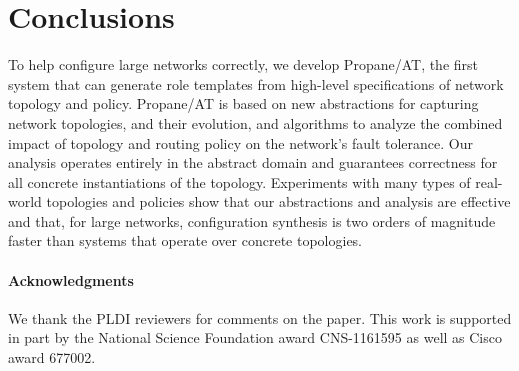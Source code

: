 \documentclass[numbers, 10pt, preprint]{sigplanconf}
\newcommand{\sysname}{{\text{}\small \sf Propane/AT}\xspace}
\newcommand{\para}[1]{\paragraph*{\textbf{#1}}}
\begin{document}
%
%
%
%

\section{Conclusions}
\label{sec:conclusions}

To help configure large networks correctly, we develop \sysname, the first system that can generate role templates from high-level specifications of network topology and policy. \sysname is based on new abstractions for capturing network topologies, and their evolution, and algorithms to analyze the combined impact of topology and routing policy on the network's fault tolerance. Our analysis operates entirely in the abstract domain and guarantees correctness for all concrete instantiations of the topology. Experiments with many types of real-world topologies and policies show that our abstractions and analysis are effective and that, for large networks, configuration synthesis is two orders of magnitude faster than systems that operate over concrete topologies.

\para{Acknowledgments}
We thank the PLDI reviewers for comments on the paper. This work is supported in part by the National Science Foundation award CNS-1161595 as well as Cisco award 677002.


%
%
%
%

\balance






%
%
%
%
\end{document}

